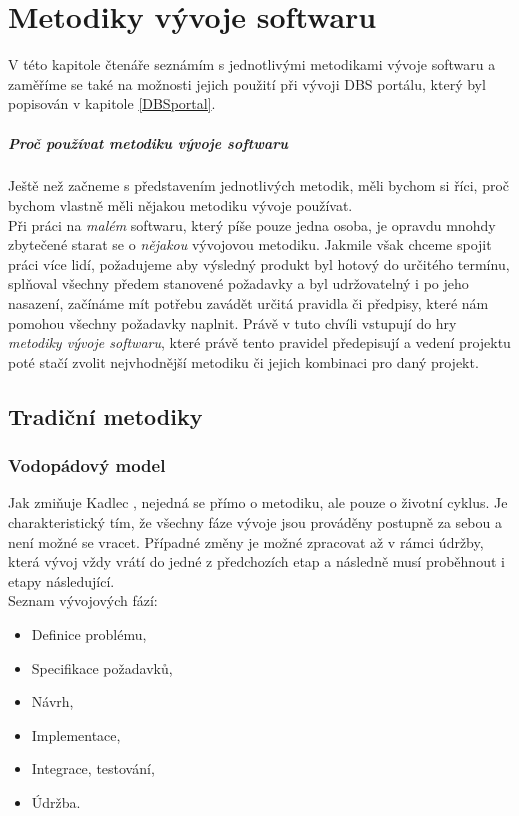 \chapter{Metodiky vývoje softwaru} \label{methods}

V této kapitole čtenáře seznámím s jednotlivými metodikami vývoje softwaru a zaměříme se také na možnosti jejich použití při vývoji DBS portálu, který byl popisován v kapitole \ref{DBSportal}.	

\paragraph{Proč používat metodiku vývoje softwaru}
Ještě než začneme s představením jednotlivých metodik, měli bychom si říci, proč bychom vlastně měli nějakou metodiku vývoje používat.\\
Při práci na \emph{malém} softwaru, který píše pouze jedna osoba, je opravdu mnohdy zbytečené starat se o \emph{nějakou} vývojovou metodiku. Jakmile však chceme spojit práci více lidí, požadujeme aby výsledný produkt byl hotový do určitého termínu, splňoval všechny předem stanovené požadavky a byl udržovatelný i po jeho nasazení, začínáme mít potřebu zavádět určitá pravidla či předpisy, které nám pomohou všechny požadavky naplnit. Právě v tuto chvíli vstupují do hry \emph{metodiky vývoje softwaru}, které právě tento  pravidel předepisují a vedení projektu poté stačí zvolit nejvhodnější metodiku či jejich kombinaci pro daný projekt.

\section{Tradiční metodiky} \label{methods:traditional}

\subsection{Vodopádový model} \label{methods:waterfall}

Jak zmiňuje Kadlec \cite{kadlec}, nejedná se přímo o metodiku, ale pouze o životní cyklus. Je charakteristický tím, že všechny fáze vývoje jsou prováděny postupně za sebou a není možné se vracet. Případné změny je možné zpracovat až v rámci údržby, která vývoj vždy vrátí do jedné z předchozích etap a následně musí proběhnout i etapy následující.\\
Seznam vývojových fází:
\begin{itemize}
	\item Definice problému,
	\item Specifikace požadavků,
	\item Návrh,
	\item Implementace,
	\item Integrace, testování,
	\item Údržba.
\end{itemize}


